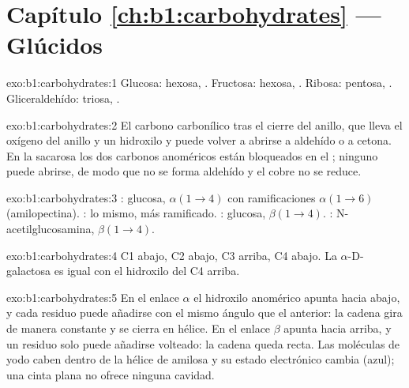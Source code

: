 \section*{Capítulo \ref{ch:b1:carbohydrates} --- Glúcidos}

\begin{solution}{exo:b1:carbohydrates:1}
Glucosa: hexosa, . Fructosa: hexosa, . Ribosa: pentosa, .
Gliceraldehído: triosa, .
\end{solution}

\begin{solution}{exo:b1:carbohydrates:2}
El carbono carbonílico tras el cierre del anillo, que lleva el oxígeno del
anillo y un hidroxilo y puede volver a abrirse a aldehído o a cetona. En la
sacarosa los dos carbonos anoméricos están bloqueados en el ; ninguno puede abrirse, de modo que no se forma aldehído y el
cobre no se reduce.
\end{solution}

\begin{solution}{exo:b1:carbohydrates:3}
: glucosa, $\alpha(1{\to}4)$ con ramificaciones $\alpha(1{\to}6)$
(amilopectina). : lo mismo, más ramificado. : glucosa,
$\beta(1{\to}4)$. : N-acetilglucosamina, $\beta(1{\to}4)$.
\end{solution}

\begin{solution}{exo:b1:carbohydrates:4}
C1 abajo, C2 abajo, C3 arriba, C4 abajo. La $\alpha$-D-galactosa es igual
con el hidroxilo del C4 arriba.
\end{solution}

\begin{solution}{exo:b1:carbohydrates:5}
En el enlace $\alpha$ el hidroxilo anomérico apunta hacia abajo, y cada
residuo puede añadirse con el mismo ángulo que el anterior: la cadena gira
de manera constante y se cierra en hélice. En el enlace $\beta$ apunta hacia
arriba, y un residuo solo puede añadirse volteado: la cadena queda recta.
Las moléculas de yodo caben dentro de la hélice de amilosa y su estado
electrónico cambia (azul); una cinta plana no ofrece ninguna cavidad.
\end{solution}

